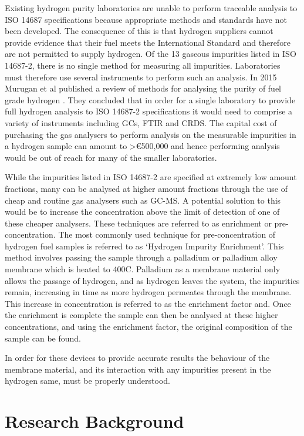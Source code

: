 Existing hydrogen purity laboratories are unable to perform traceable analysis to ISO 14687 
specifications because appropriate methods and standards have not been developed. The consequence 
of this is that hydrogen suppliers cannot provide evidence that their fuel meets the International 
Standard and therefore are not permitted to supply hydrogen. Of the 13 gaseous impurities listed in 
ISO 14687-2, there is no single method for measuring all impurities. Laboratories must therefore use 
several instruments to perform such an analysis.  In 2015 Murugan et al published a review of methods 
for analysing the purity of fuel grade hydrogen \cite{Murugan2015}. They concluded that in order for a single 
laboratory to provide full hydrogen analysis to ISO 14687-2 specifications it would need to comprise 
a variety of instruments including GCs, FTIR and CRDS. The capital cost of purchasing the gas 
analysers to perform analysis on the measurable impurities in a hydrogen sample can amount to 
>€500,000 \cite{Murugan2015} and hence performing analysis would be out of reach for many of the smaller laboratories. 

While the impurities listed in ISO 14687-2 are specified at extremely low amount fractions, 
many can be analysed at higher amount fractions through the use of cheap and routine gas 
analysers such as GC-MS. A potential solution to this would be to increase the concentration 
above the limit of detection of one of these cheaper analysers. These techniques are referred 
to as enrichment or pre-concentration. The most commonly used technique for pre-concentration 
of hydrogen fuel samples is referred to as ‘Hydrogen Impurity Enrichment’.  This method involves 
passing the sample through a palladium or palladium alloy membrane which is heated to 400\textdegree C. 
Palladium as a membrane material only allows the passage of hydrogen, and as hydrogen leaves the system, 
the impurities remain, increasing in time as more hydrogen permeates through the membrane.
This increase in concentration is referred to as the enrichment factor and. 
Once the enrichment is complete the sample can then be analysed at these higher concentrations, 
and using the enrichment factor, the original composition of the sample can be found. 

In order for these devices to provide accurate results the behaviour of the membrane material, and its interaction with any impurities present in the hydrogen same, must be properly understood.  


\section{Research Background}
